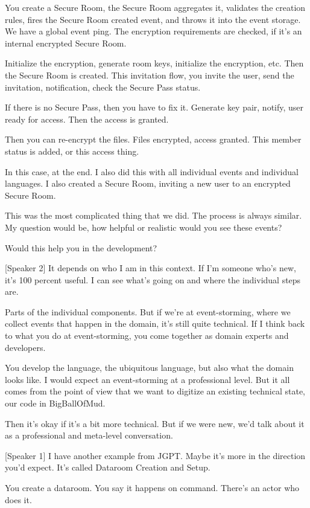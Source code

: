 You create a Secure Room, the Secure Room aggregates it, validates the creation rules, fires the Secure Room created event, and throws it into the event storage. We have a global event ping. The encryption requirements are checked, if it's an internal encrypted Secure Room.

Initialize the encryption, generate room keys, initialize the encryption, etc. Then the Secure Room is created. This invitation flow, you invite the user, send the invitation, notification, check the Secure Pass status.

If there is no Secure Pass, then you have to fix it. Generate key pair, notify, user ready for access. Then the access is granted.

Then you can re-encrypt the files. Files encrypted, access granted. This member status is added, or this access thing.

In this case, at the end. I also did this with all individual events and individual languages. I also created a Secure Room, inviting a new user to an encrypted Secure Room.

This was the most complicated thing that we did. The process is always similar. My question would be, how helpful or realistic would you see these events?

Would this help you in the development?

[Speaker 2]
It depends on who I am in this context. If I'm someone who's new, it's 100 percent useful. I can see what's going on and where the individual steps are.

Parts of the individual components. But if we're at event-storming, where we collect events that happen in the domain, it's still quite technical. If I think back to what you do at event-storming, you come together as domain experts and developers.

You develop the language, the ubiquitous language, but also what the domain looks like. I would expect an event-storming at a professional level. But it all comes from the point of view that we want to digitize an existing technical state, our code in BigBallOfMud.

Then it's okay if it's a bit more technical. But if we were new, we'd talk about it as a professional and meta-level conversation.

[Speaker 1]
I have another example from JGPT. Maybe it's more in the direction you'd expect. It's called Dataroom Creation and Setup.

You create a dataroom. You say it happens on command. There's an actor who does it.

